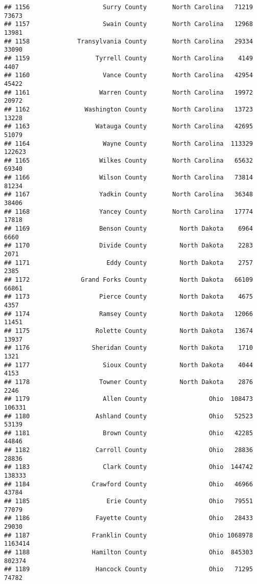 \documentclass[
]{article}
\begin{document}
\begin{verbatim}
## 1156                    Surry County       North Carolina   71219   73673
## 1157                    Swain County       North Carolina   12968   13981
## 1158             Transylvania County       North Carolina   29334   33090
## 1159                  Tyrrell County       North Carolina    4149    4407
## 1160                    Vance County       North Carolina   42954   45422
## 1161                   Warren County       North Carolina   19972   20972
## 1162               Washington County       North Carolina   13723   13228
## 1163                  Watauga County       North Carolina   42695   51079
## 1164                    Wayne County       North Carolina  113329  122623
## 1165                   Wilkes County       North Carolina   65632   69340
## 1166                   Wilson County       North Carolina   73814   81234
## 1167                   Yadkin County       North Carolina   36348   38406
## 1168                   Yancey County       North Carolina   17774   17818
## 1169                   Benson County         North Dakota    6964    6660
## 1170                   Divide County         North Dakota    2283    2071
## 1171                     Eddy County         North Dakota    2757    2385
## 1172              Grand Forks County         North Dakota   66109   66861
## 1173                   Pierce County         North Dakota    4675    4357
## 1174                   Ramsey County         North Dakota   12066   11451
## 1175                  Rolette County         North Dakota   13674   13937
## 1176                 Sheridan County         North Dakota    1710    1321
## 1177                    Sioux County         North Dakota    4044    4153
## 1178                   Towner County         North Dakota    2876    2246
## 1179                    Allen County                 Ohio  108473  106331
## 1180                  Ashland County                 Ohio   52523   53139
## 1181                    Brown County                 Ohio   42285   44846
## 1182                  Carroll County                 Ohio   28836   28836
## 1183                    Clark County                 Ohio  144742  138333
## 1184                 Crawford County                 Ohio   46966   43784
## 1185                     Erie County                 Ohio   79551   77079
## 1186                  Fayette County                 Ohio   28433   29030
## 1187                 Franklin County                 Ohio 1068978 1163414
## 1188                 Hamilton County                 Ohio  845303  802374
## 1189                  Hancock County                 Ohio   71295   74782

\end{verbatim}
\end{document}
